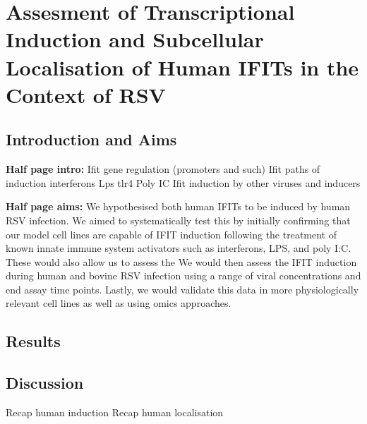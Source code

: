 \chapter{Assesment of Transcriptional Induction and Subcellular Localisation of Human IFITs in the Context of RSV} \label{ch:Assesment of Transcriptional Induction and Subcellular Localisation of Human IFITs in the Context of RSV}
\section{Introduction and Aims} \label{sec:Introduction and Aims-Chapter 1}
\textbf{Half page intro:}
Ifit gene regulation (promoters and such) \newline
Ifit paths of induction \newline
interferons \newline
Lps tlr4 \newline
Poly IC \newline
Ifit induction by other viruses and inducers \newline


\textbf{Half page aims:}
We hypothesised both human IFITs to be induced by human RSV infection. We aimed to systematically test this by initially confirming that our model cell lines are capable of IFIT induction following the treatment of known innate immune system activators such as interferons, LPS, and poly I:C. These would also allow us to assess the  We would then assess the IFIT induction during human and bovine RSV infection using a range of viral concentrations and end assay time points. Lastly, we would validate this data in more physiologically relevant cell lines as well as using omics approaches.

\section{Results} \label{sec:Results-Chapter 1}



\section{Discussion} \label{sec:Discussion Chapter 1}
Recap human induction \newline
Recap human localisation



